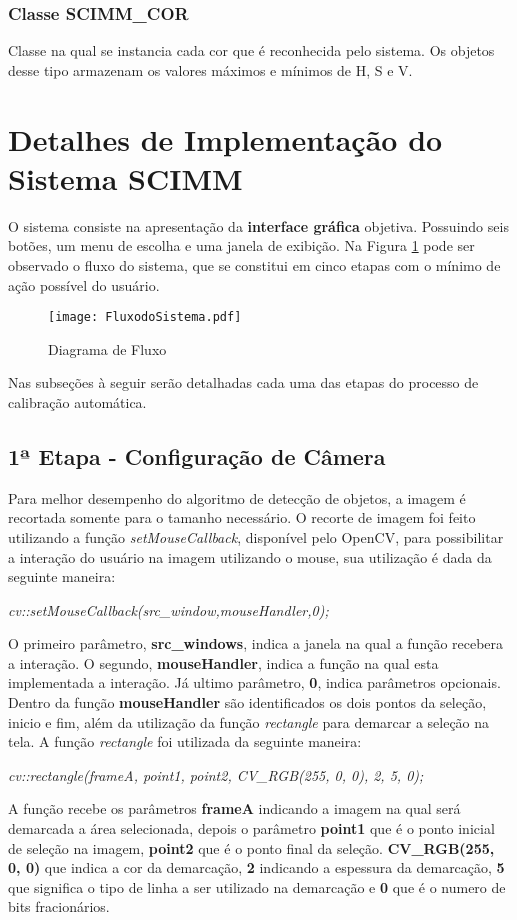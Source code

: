 \subsubsection{Classe SCIMM\_COR}
	Classe na qual se instancia cada cor que é reconhecida pelo sistema. Os objetos desse tipo armazenam os valores máximos e mínimos de H, S e V. 


\section{Detalhes de Implementação do Sistema SCIMM}

		 O sistema consiste na apresentação da \textbf{interface gráfica} objetiva. Possuindo seis botões, um menu de escolha e uma janela de exibição.
		 Na Figura \ref{fig:FlowCHart} pode ser observado o fluxo do sistema, que se constitui em cinco etapas com o mínimo de ação possível do usuário.
		
		\begin{figure}[H]
			\centering
			\texttt{[image: FluxodoSistema.pdf]}
			\caption{Diagrama de Fluxo}
			\label{fig:FlowCHart}
		\end{figure}			
Nas subseções à seguir serão detalhadas cada uma das etapas do processo de calibração automática.
		\subsection{1ª Etapa - Configuração de Câmera}
		

Para melhor desempenho do algoritmo de detecção de objetos, a imagem é recortada somente para o tamanho necessário. O recorte de imagem foi feito utilizando a função {\it setMouseCallback}, disponível pelo OpenCV, para possibilitar a interação do usuário na imagem utilizando o mouse, sua utilização é dada da seguinte maneira:
\begin{center}
\centering \textit{ cv::setMouseCallback(src\_window,mouseHandler,0);}
\end{center}
O primeiro parâmetro, \textbf{src\_windows}, indica a janela na qual a função recebera a interação. O segundo, \textbf{mouseHandler}, indica a função na qual esta implementada a interação. Já ultimo parâmetro, \textbf{0}, indica parâmetros opcionais.
Dentro da função \textbf{mouseHandler} são identificados os dois pontos da seleção, inicio e fim, além da utilização da função \textit{rectangle} para demarcar a seleção na tela. A função \textit{rectangle} foi utilizada da seguinte maneira:
\begin{center}
\centering \textit{ cv::rectangle(frameA, point1, point2, CV\_RGB(255, 0, 0), 2, 5, 0);}
\end{center}
A função recebe os parâmetros \textbf{frameA} indicando a imagem na qual será demarcada a área selecionada, depois o parâmetro \textbf{point1} que é o ponto inicial de seleção na imagem, \textbf{point2} que é o ponto final da seleção. \textbf{CV\_RGB(255, 0, 0)} que indica a cor da demarcação, \textbf{2} indicando a espessura da demarcação, \textbf{5} que significa o tipo de linha a ser utilizado na demarcação e \textbf{0} que é o numero de bits fracionários.

